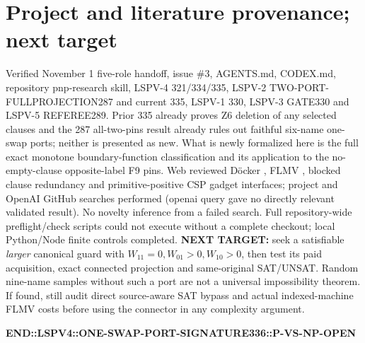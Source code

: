\documentclass[11pt]{article}
\begin{document}
\section{Project and literature provenance; next target}
Verified November 1 five-role handoff, issue \#3, AGENTS.md, CODEX.md, repository pnp-research skill, LSPV-4 321/334/335, LSPV-2 TWO-PORT-FULLPROJECTION287 and current 335, LSPV-1 330, LSPV-3 GATE330 and LSPV-5 REFEREE289. Prior 335 already proves Z6 deletion of any selected clauses and the 287 all-two-pins result already rules out faithful six-name one-swap ports; neither is presented as new. What is newly formalized here is the full exact monotone boundary-function classification and its application to the no-empty-clause opposite-label F9 pins. Web reviewed D\"ocker \cite{docker2019}, FLMV \cite{flmv2005}, blocked clause redundancy and primitive-positive CSP gadget interfaces; project and OpenAI GitHub searches performed (openai query gave no directly relevant validated result). No novelty inference from a failed search. Full repository-wide preflight/check scripts could not execute without a complete checkout; local Python/Node finite controls completed.
\noindent\textbf{NEXT TARGET:} seek a satisfiable \emph{larger} canonical guard with $W_{11}=0,W_{01}>0,W_{10}>0$, then test its paid acquisition, exact connected projection and same-original SAT/UNSAT. Random nine-name samples without such a port are not a universal impossibility theorem. If found, still audit direct source-aware SAT bypass and actual indexed-machine FLMV costs before using the connector in any complexity argument.


\noindent\textbf{END::LSPV4::ONE-SWAP-PORT-SIGNATURE336::P-VS-NP-OPEN}
\end{document}
